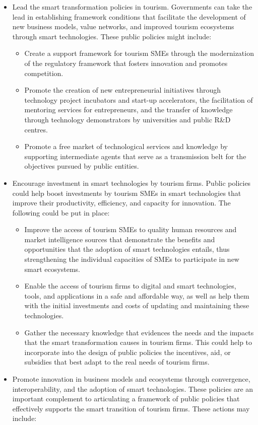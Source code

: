 \documentclass[
  letterpaper,
  DIV=11,
  numbers=noendperiod]{scrreprt}
\begin{document}
\begin{itemize}
\item
  Lead the smart transformation policies in tourism. Governments can
  take the lead in establishing framework conditions that facilitate the
  development of new business models, value networks, and improved
  tourism ecosystems through smart technologies. These public policies
  might include:

  \begin{itemize}
  \item
    Create a support framework for tourism SMEs through the
    modernization of the regulatory framework that fosters innovation
    and promotes competition.
  \item
    Promote the creation of new entrepreneurial initiatives through
    technology project incubators and start-up accelerators, the
    facilitation of mentoring services for entrepreneurs, and the
    transfer of knowledge through technology demonstrators by
    universities and public R\&D centres.
  \item
    Promote a free market of technological services and knowledge by
    supporting intermediate agents that serve as a transmission belt for
    the objectives pursued by public entities.
  \end{itemize}
\item
  Encourage investment in smart technologies by tourism firms. Public
  policies could help boost investments by tourism SMEs in smart
  technologies that improve their productivity, efficiency, and capacity
  for innovation. The following could be put in place:

  \begin{itemize}
  \item
    Improve the access of tourism SMEs to quality human resources and
    market intelligence sources that demonstrate the benefits and
    opportunities that the adoption of smart technologies entails, thus
    strengthening the individual capacities of SMEs to participate in
    new smart ecosystems.
  \item
    Enable the access of tourism firms to digital and smart
    technologies, tools, and applications in a safe and affordable way,
    as well as help them with the initial investments and costs of
    updating and maintaining these technologies.
  \item
    Gather the necessary knowledge that evidences the needs and the
    impacts that the smart transformation causes in tourism firms. This
    could help to incorporate into the design of public policies the
    incentives, aid, or subsidies that best adapt to the real needs of
    tourism firms.
  \end{itemize}
\item
  Promote innovation in business models and ecosystems through
  convergence, interoperability, and the adoption of smart technologies.
  These policies are an important complement to articulating a framework
  of public policies that effectively supports the smart transition of
  tourism firms. These actions may include:


\end{itemize}
\end{document}
